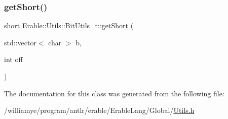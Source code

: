 \mbox{\label{class_erable_1_1_utils_1_1_bit_utils__t_adec90f50d80b37545da2470dcf026bfe}} 
\subsubsection{\texorpdfstring{getShort()}{getShort()}}
{\footnotesize\ttfamily short Erable\+::\+Utils\+::\+Bit\+Utils\+\_\+t\+::get\+Short (\begin{DoxyParamCaption}\item[{std\+::vector$<$ char $>$}]{b,  }\item[{int}]{off }\end{DoxyParamCaption})\hspace{0.3cm}{\ttfamily [inline]}}



The documentation for this class was generated from the following file\+:\begin{DoxyCompactItemize}
\item 
/williamye/program/antlr/erable/\+Erable\+Lang/\+Global/\mbox{\hyperlink{_utils_8h}{Utils.\+h}}\end{DoxyCompactItemize}
